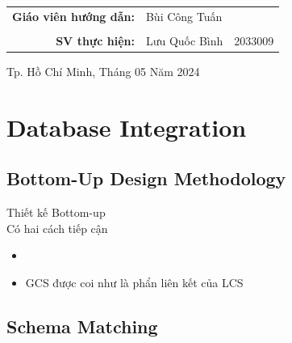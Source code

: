 \documentclass[a4paper]{article}
\begin{document}
\begin{titlepage}
\begin{center}
\begin{tabular}{c}
\\
\hline
\end{tabular}
\end{center}

\vspace{0.7cm}

\begin{table}[h]
\centering \large
\begin{tabular}{rll}
\textbf{Giáo viên hướng dẫn:} & Bùi Công Tuấn &   \\
 & & \\
\textbf{SV thực hiện:} & Lưu Quốc Bình & 2033009  \\

\end{tabular}
\end{table}

\vspace{1.0cm}
\begin{center}
{\footnotesize Tp. Hồ Chí Minh, Tháng 05 Năm 2024}
\end{center}
\end{titlepage}

\newpage
\tableofcontents
\newpage



\newpage
\section{Database Integration}
\subsection{Bottom-Up Design Methodology}
Thiết kế Bottom-up \\

Có hai cách tiếp cận
\begin{itemize}
    \item
    \item GCS được coi như là phẩn liên kết của LCS
\end{itemize}

\subsection{Schema Matching}
\end{document}
